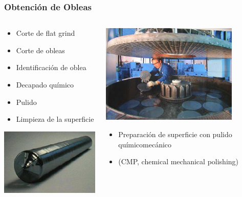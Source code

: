 \documentclass[aspectratio=169,10pt]{beamer}
\begin{document}
\begin{frame}
\frametitle{Obtención de Obleas}

\begin{columns}
	\begin{column}{0.5\textwidth}

		\begin{itemize}
			\item Corte de flat grind
			\item Corte de obleas
			\item Identificación de oblea
			\item Decapado químico
			\item Pulido
			\item Limpieza de la superficie
		\end{itemize}
	
	\centering
	\includegraphics[width=5.5cm]{wafer}
	\end{column}
	\begin{column}{0.5\textwidth}
		\centering
		\includegraphics[width=6.5cm]{wafer2}
		
		\raggedright
		\begin{itemize}
			\item Preparación de superficie con pulido químicomecánico
			\item (CMP, chemical mechanical polishing)
		\end{itemize}
	\end{column}
\end{columns}
\end{frame}
\end{document}
